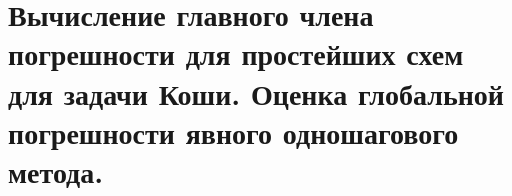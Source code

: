 \section{Вычисление главного члена погрешности для простейших схем для задачи Коши. Оценка глобальной погрешности явного одношагового метода.}
